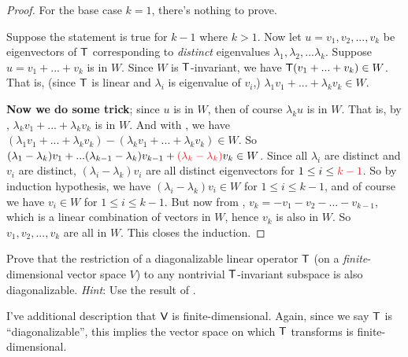 \begin{proof}
For the base case \(k = 1\), there's nothing to prove.

Suppose the statement is true for \(k - 1\) where \(k > 1\).
Now let \(u = v_1, v_2, ..., v_k\) be eigenvectors of \(\textsf{T}\) corresponding to \emph{distinct} eigenvalues \(\lambda_1, \lambda_2, ... \lambda_k\).
Suppose \(u = v_1 + ... + v_k\) is in \(W\). 
Since \(W\) is \(\textsf{T}\)-invariant, we have \(\textsf{T}(v_1 + ... + v_k) \in W\).
That is, (since \(\textsf{T}\) is linear and \(\lambda_i\) is eigenvalue of \(v_i\),) \(\lambda_1 v_1 + ... + \lambda_k v_k \in W\). 

\textbf{Now we do some trick};
since \(u\) is in \(W\), then of course \(\lambda_k u\) is in \(W\).
That is, by , \(\lambda_k v_1 + ... + \lambda_k v_k\) is in \(W\).
And with , we have \((\lambda_1 v_1 + ... + \lambda_k v_k) - (\lambda_k v_1 + ... + \lambda_k v_k) \in W\).
So \((\lambda_1 - \lambda_k) v_1 + ... (\lambda_{k - 1} - \lambda_k) v_{k - 1} + \RED{(\lambda_k - \lambda_k)} v_k \in W\).
Since all \(\lambda_i\) are distinct and \(v_i\) are distinct, \((\lambda_i - \lambda_k) v_i\) are all distinct eigenvectors for \(1 \le i \le \RED{k - 1}\).
So by induction hypothesis, we have \((\lambda_i - \lambda_k) v_i \in W\) for \(1 \le i \le k - 1\), and of course we have \(v_i \in W\) for \(1 \le i \le k - 1\).
But now from , \(v_k = -v_1 - v_2 - ... - v_{k - 1}\), which is a linear combination of vectors in \(W\), hence \(v_k\) is also in \(W\).
So \(v_1, v_2, ..., v_k\) are all in \(W\).
This closes the induction.
\end{proof}

\begin{exercise} \label{exercise 5.4.24}
Prove that the restriction of a diagonalizable linear operator \(\textsf{T}\) (on a \emph{finite}-dimensional vector space \(V\)) to any nontrivial \(\textsf{T}\)-invariant subspace is also diagonalizable.
\emph{Hint}: Use the result of .
\end{exercise}

\begin{note}
I've additional description that \(\textsf{V}\) is finite-dimensional.
Again, since we say \(\textsf{T}\) is ``diagonalizable'', this implies the vector space on which \(\textsf{T}\) transforms is finite-dimensional.
\end{note}

